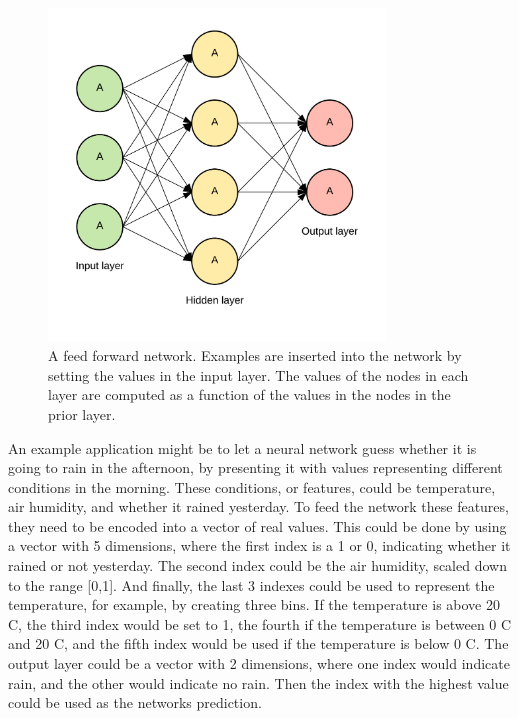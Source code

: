 \begin{figure}[htp]
	\centering
	\includegraphics[width=0.8\textwidth]{fig/neural-network.png}
	\caption{A feed forward network. Examples are inserted into the network by setting the values in the input layer. The values of the nodes in each layer are computed as a function of the values in the nodes in the prior layer.}
	\label{fig:neural-network}
\end{figure}

An example application might be to let a neural network guess whether it is going to rain in the afternoon, by presenting it with values representing different conditions in the morning. These conditions, or features, could be temperature, air humidity, and whether it rained yesterday. To feed the network these features, they need to be encoded into a vector of real values. This could be done by using a vector with 5 dimensions, where the first index is a 1 or 0, indicating whether it rained or not yesterday. The second index could be the air humidity, scaled down to the range [0,1]. And finally, the last 3 indexes could be used to represent the temperature, for example, by creating three bins. If the temperature is above 20 \degree C, the third index would be set to 1, the fourth if the temperature is between 0 \degree C and 20 \degree C, and the fifth index would be used if the temperature is below 0 \degree C. The output layer could be a vector with 2 dimensions, where one index would indicate rain, and the other would indicate no rain. Then the index with the highest value could be used as the networks prediction.

